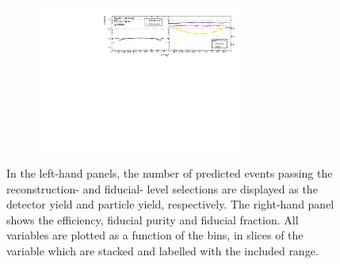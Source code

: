 \begin{figure}[htb]
\begin{subfigure}{.99\textwidth}
    \end{subfigure}
    \begin{subfigure}{.99\textwidth}\centering
        \includegraphics[width = 0.75\textwidth]{Figures/m4l/UnfoldingStudies/v014_inputs/cosThetaStar3_m4loffshellinputs.pdf}
    \end{subfigure}
    \caption{In the left-hand panels, the number of predicted events passing the reconstruction- and fiducial- level selections are displayed as the detector yield and particle yield, respectively. The right-hand panel shows the efficiency, fiducial purity and fiducial fraction. All variables are plotted as a function of the \costhetastar bins, in slices of the \mFourL variable which are stacked and labelled with the included \mFourL range.
    \label{fig:costhet2unf}}
\end{figure}  

\FloatBarrier
\clearpage


